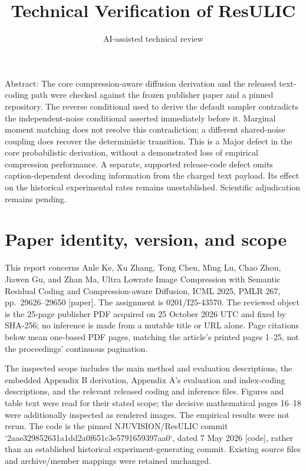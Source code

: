 \documentclass[10pt]{article}
\title{Technical Verification of ResULIC}
\author{AI-assisted technical review}
\date{}
\begin{document}
\maketitle
Abstract: The core compression-aware diffusion derivation and the released text-coding path were checked against the frozen publisher paper and a pinned repository. The reverse conditional used to derive the default sampler contradicts the independent-noise conditional asserted immediately before it. Marginal moment matching does not resolve this contradiction; a different shared-noise coupling does recover the deterministic transition. This is a Major defect in the core probabilistic derivation, without a demonstrated loss of empirical compression performance. A separate, supported release-code defect omits caption-dependent decoding information from the charged text payload. Its effect on the historical experimental rates remains unestablished. Scientific adjudication remains pending.\par
\section*{Paper identity, version, and scope}
This report concerns Anle Ke, Xu Zhang, Tong Chen, Ming Lu, Chao Zhou, Jiawen Gu, and Zhan Ma, Ultra Lowrate Image Compression with Semantic Residual Coding and Compression-aware Diffusion, ICML 2025, PMLR 267, pp. 29626–29650 [paper]. The assignment is 0201/I25-43570. The reviewed object is the 25-page publisher PDF acquired on 25 October 2026 UTC and fixed by SHA-256; no inference is made from a mutable title or URL alone. Page citations below mean one-based PDF pages, matching the article’s printed pages 1–25, not the proceedings’ continuous pagination.\par
The inspected scope includes the main method and evaluation descriptions, the embedded Appendix B derivation, Appendix A’s evaluation and index-coding descriptions, and the relevant released coding and inference files. Figures and table text were read for their stated scope; the decisive mathematical pages 16–18 were additionally inspected as rendered images. The empirical results were not rerun. The code is the pinned NJUVISION/ResULIC commit `2aae329852631a1dd2a0f651c3e5791659397aa0`, dated 7 May 2026 [code], rather than an established historical experiment-generating commit. Existing source files and archive/member mappings were retained unchanged.\par
\end{document}
